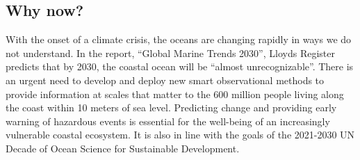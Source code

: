 \documentclass[12pt]{article}
\begin{document}
\vspace*{-0.2cm}
\subsection{Why now?}

With the onset of a climate crisis, the oceans are changing rapidly in
ways we do not understand. In the report, ``Global Marine Trends
2030'', Lloyds Register predicts that by 2030, the coastal ocean will
be ``almost unrecognizable''. There is an urgent need to develop and
deploy new smart observational methods to provide information at
scales that matter to the 600 million people living along the coast
within 10 meters of sea level.  Predicting change and providing early
warning of hazardous events is essential for the well-being of an
increasingly vulnerable coastal ecosystem. It is also in line with the
goals of the 2021-2030 UN Decade of Ocean Science for Sustainable
Development.


\end{document}

